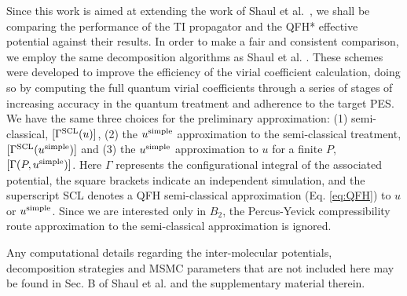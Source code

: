     Since this work is aimed at extending the work of Shaul et al.~\cite{Shaul2012}, we shall be comparing the performance of the TI propagator and the QFH* effective potential against their results. In order to make a fair and consistent comparison, we employ the same decomposition algorithms as Shaul et al. \cite{Shaul2012}. These schemes were developed to improve the efficiency of the virial coefficient calculation, doing so by computing the full quantum virial coefficients through a series of stages of increasing accuracy in the quantum treatment and adherence to the target PES. We have the same three choices for the preliminary approximation: (1) semi-classical, $[\Gamma^{\rm SCL}(u)]$, (2) the $u^{\rm simple}$ approximation to the semi-classical treatment, $[\Gamma^{\rm SCL}(u^{\rm simple})]$ and (3) the $u^{\rm simple}$ approximation to $u$ for a finite $P$, $[\Gamma (P,u^{\rm simple})]$. Here $\Gamma$ represents the configurational integral of the associated potential, the square brackets indicate an independent simulation, and the superscript SCL denotes a QFH semi-classical approximation (Eq. \eqref{eq:QFH}) to $u$ or $u^{\rm simple}$. Since we are interested only in $B_2$, the Percus-Yevick compressibility route approximation\cite{Percus1958,Hansen,Shaul2011} to the semi-classical approximation is ignored.

    Any computational details regarding the inter-molecular potentials, decomposition strategies and MSMC parameters that are not included here may be found in Sec. B of Shaul et al. \cite{Shaul2012} and the supplementary material therein.
